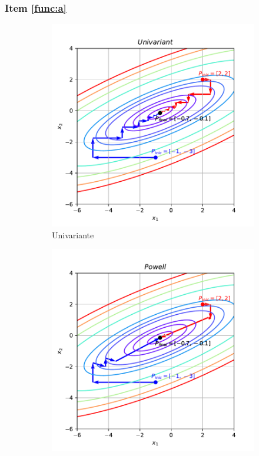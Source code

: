 \documentclass[10pt, a4paper]{article}
\begin{document}
\subsubsection{Item \ref{func:a}}

\begin{figure}[htpb]
  \centering
  \begin{subfigure}[b]{0.32\textwidth}
      \centering
      \includegraphics[width=\textwidth]{images/q1a_Univariant.pdf}
      \caption{Univariante}
      \label{fig:q1a_univariant}
  \end{subfigure}
  \hfill
  \begin{subfigure}[b]{0.32\textwidth}
    \centering
    \includegraphics[width=\textwidth]{images/q1a_Powell.pdf}

\end{subfigure}
\end{figure}
\end{document}
